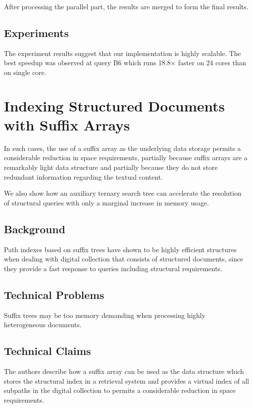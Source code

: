 \documentclass{paper}
\begin{document}
After processing the parallel part, the results are merged to form the final 
results.


\subsection{Experiments}

The experiment results suggest that our implementation is highly
scalable. The best speedup was observed at query B6 which runs 18.8×
faster on 24 cores than on single core. 
 
 

\section{Indexing Structured Documents with Suffix Arrays}

In such cases, the use of a suffix array as the
underlying data storage permits a considerable reduction in space
requirements, partially because suffix arrays are a remarkably light
data structure and partially because they do not store redundant
information regarding the textual content. 

 We also show how an auxiliary
ternary search tree can accelerate the resolution of structural
queries with only a marginal increase in memory usage.

\subsection{Background}

Path indexes based on suffix trees have shown to be highly efficient
structures when dealing with digital collection that consists of
structured documents, since they provide a fast response to queries
including structural requirements.
	
    
\subsection{Technical Problems}

Suffix trees may be too memory demanding when processing highly
heterogeneous documents.

\subsection{Technical Claims}

The authors describe how a suffix array can be used as the data
structure which stores the structural index in a retrieval system and
provides a virtual index of all subpaths in the digital collection 
to permits a considerable reduction in space requirements.
\end{document}
